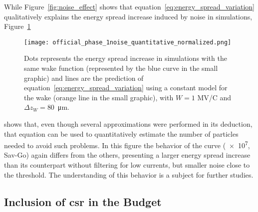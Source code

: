     While Figure~\ref{fig:noise_effect} shows that equation~\eqref{eq:energy_spread_variation} qualitatively explains the energy spread increase induced by noise in simulations, Figure~\ref{fig:quantitative_noise_effect}
    \begin{figure}
        \centering
        \texttt{[image: official\_phase\_1noise\_quantitative\_normalized.png]}
        \caption[Application of equation~\eqref{eq:energy_spread_variation} to account for energy spread increase.]{Dots represents the energy spread increase in simulations with the same wake function (represented by the blue curve in the small graphic) and lines are the prediction of equation~\eqref{eq:energy_spread_variation} using a constant model for the wake (orange line in the small graphic), with $W=1$ MV/C and $\Delta z_W = $\SI{80}{\micro\meter}.}
        \label{fig:quantitative_noise_effect}
    \end{figure}
    shows that, even though several approximations were performed in its deduction, that equation can be used to quantitatively estimate the number of particles needed to avoid such problems. In this figure the behavior of the curve (\num{e7}, Sav-Go) again differs from the others, presenting a larger energy spread increase than its counterpart without filtering for low currents, but smaller noise close to the threshold. The understanding of this behavior is a subject for further studies.

\subsection{Inclusion of \gls{csr} in the Budget}


